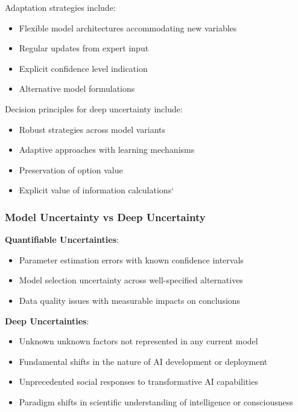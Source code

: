\documentclass[
  11pt,
  letterpaper,
]{book}
\providecommand{\tightlist}{%
  \setlength{\itemsep}{0pt}\setlength{\parskip}{0pt}}
\begin{document}
Adaptation strategies include:

\begin{itemize}
\tightlist
\item
  Flexible model architectures accommodating new variables
\item
  Regular updates from expert input
\item
  Explicit confidence level indication
\item
  Alternative model formulations
\end{itemize}

Decision principles for deep uncertainty include:

\begin{itemize}
\tightlist
\item
  Robust strategies across model variants
\item
  Adaptive approaches with learning mechanisms
\item
  Preservation of option value
\item
  Explicit value of information calculations`
\end{itemize}

\subsubsection{Model Uncertainty vs Deep
Uncertainty}\label{sec-model-vs-deep-uncertainty}

\textbf{Quantifiable Uncertainties}:

\begin{itemize}
\tightlist
\item
  Parameter estimation errors with known confidence intervals
\item
  Model selection uncertainty across well-specified alternatives
\item
  Data quality issues with measurable impacts on conclusions
\end{itemize}

\textbf{Deep Uncertainties}:

\begin{itemize}
\tightlist
\item
  Unknown unknown factors not represented in any current model
\item
  Fundamental shifts in the nature of AI development or deployment
\item
  Unprecedented social responses to transformative AI capabilities
\item
  Paradigm shifts in scientific understanding of intelligence or
  consciousness
\end{itemize}
\end{document}
